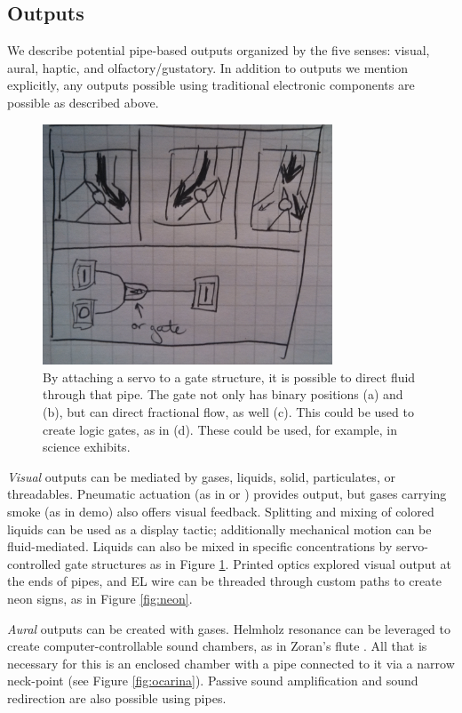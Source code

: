 \subsection{Outputs}

We describe potential pipe-based outputs organized by the five senses: visual, aural, haptic, and olfactory/gustatory.  In addition to outputs we mention explicitly, any outputs possible using traditional electronic components are possible as described above.

\begin{figure}[h]
\centering
    \includegraphics[width=3.4in]{figures/placeholder/direct.jpg}
\caption{By attaching a servo to a gate structure, it is possible to direct fluid through that pipe.  The gate not only has binary positions (a) and (b), but can direct fractional flow, as well (c).  This could be used to create logic gates, as in (d).  These could be used, for example, in science exhibits.}
\label{fig:direct}
\end{figure}

\emph{Visual} outputs can be mediated by gases, liquids, solid, particulates, or threadables.  Pneumatic actuation (as in \cite{Yao-pneui} or \cite{Harrison-buttons}) provides output, but gases carrying smoke (as in \cite{Sodhi-aireal} demo) also offers visual feedback.  Splitting and mixing of colored liquids can be used as a display tactic; additionally mechanical motion can be fluid-mediated.  Liquids can also be mixed in specific concentrations by servo-controlled gate structures as in Figure \ref{fig:direct}.  Printed optics \cite{Willis-printedoptics} explored visual output at the ends of pipes, and   EL wire can be threaded through custom paths to create neon signs, as in Figure \ref{fig:neon}.

\emph{Aural} outputs can be created with gases.  Helmholz resonance can be leveraged to create computer-controllable sound chambers, as in Zoran's flute \cite{Zoran-flute}.  All that is necessary for this is an enclosed chamber with a pipe connected to it via a narrow neck-point (see Figure \ref{fig:ocarina}).  Passive sound amplification and sound redirection are also possible using pipes.

